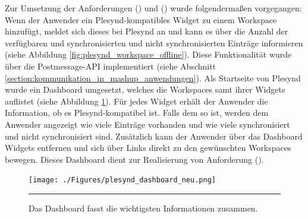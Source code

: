 Zur Umsetzung der Anforderungen  (\emph{\requirementWidgetInformSystem}) und  (\emph{\requirementWidgetInformUser})  wurde folgendermaßen vorgegangen: Wenn der Anwender ein Plesynd-kompatibles Widget zu einem Workspace hinzufügt, meldet sich dieses bei Plesynd an und kann es über die Anzahl der verfügbaren und synchronisierten und nicht synchronisierten Einträge informieren (siehe Abbildung \ref{fig:plesynd_workspace_offline}). Diese Funktionalität wurde über die Postmessage-API implementiert (siehe Abschnitt \ref{section:kommunikation_in_mashup_anwendungen}). Als Startseite von Plesynd wurde ein Dashboard umgesetzt, welches die Workspaces samt ihrer Widgets auflistet (siehe Abbildung \ref{fig:plesynd_dashboard}). Für jedes Widget erhält der Anwender die Information, ob es Plesynd-kompatibel ist. Falls dem so ist, werden dem Anwender angezeigt wie viele Einträge vorhanden und wie viele synchronisiert und nicht synchronisiert sind. Zusätzlich kann der Anwender über das Dashboard Widgets entfernen und sich über Links direkt zu den gewünschten Workspaces bewegen. Dieses Dashboard dient zur Realisierung von Anforderung  (\emph{\requirementDashboard}).
\begin{figure}
  \centering
  \texttt{[image: ./Figures/plesynd\_dashboard\_neu.png]}
    \rule{35em}{0.5pt}
  \caption[Plesynd User"=Interface: Dashboard]{Das Dashboard fasst die wichtigsten Informationen zusammen.}
  \label{fig:plesynd_dashboard}
\end{figure}

